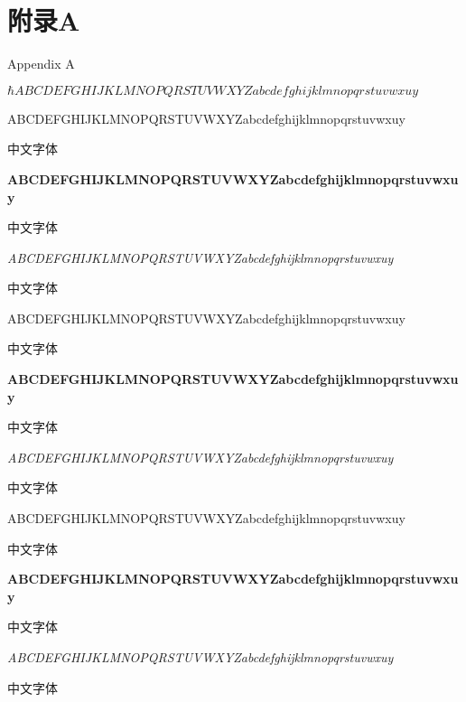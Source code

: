 \documentclass[bibstyle=numbers]{Settings/XMUthesis}
\begin{document}
\frontmatter\xiaosi
\maketitle
%



\xmutableofcontents
\mainmatter%
\pagestyle{fancy}


\backmatter
\nocite{*} 

\chapter{附录A}{Appendix A}


\( \hbar ABCDEFGHIJKLMNOPQRSTUVWXYZabcdefghijklmnopqrstuvwxuy \)


 ABCDEFGHIJKLMNOPQRSTUVWXYZabcdefghijklmnopqrstuvwxuy 
 
 中文字体

{\bfseries ABCDEFGHIJKLMNOPQRSTUVWXYZabcdefghijklmnopqrstuvwxuy 
 
 中文字体}

\itshape ABCDEFGHIJKLMNOPQRSTUVWXYZabcdefghijklmnopqrstuvwxuy 
 
 中文字体

\sffamily ABCDEFGHIJKLMNOPQRSTUVWXYZabcdefghijklmnopqrstuvwxuy 

中文字体

\bfseries ABCDEFGHIJKLMNOPQRSTUVWXYZabcdefghijklmnopqrstuvwxuy 
 
 中文字体
\newpage

\itshape ABCDEFGHIJKLMNOPQRSTUVWXYZabcdefghijklmnopqrstuvwxuy 
 
 中文字体

\ttfamily ABCDEFGHIJKLMNOPQRSTUVWXYZabcdefghijklmnopqrstuvwxuy 

中文字体

\bfseries ABCDEFGHIJKLMNOPQRSTUVWXYZabcdefghijklmnopqrstuvwxuy 
 
 中文字体

\itshape ABCDEFGHIJKLMNOPQRSTUVWXYZabcdefghijklmnopqrstuvwxuy 
 
 中文字体
 
\end{document}
